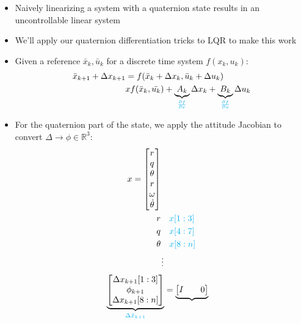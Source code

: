 \documentclass[11pt]{article}
\begin{document}
\begin{itemize}
    \item Naively linearizing a system with a quaternion state results in an uncontrollable linear system
    \item We'll apply our quaternion differentiation tricks to LQR to make this work
    \item Given a reference $\bar{x}_k, \bar{u}_k$ for a discrete time system $f(x_k,u_k):$
    \begin{align*}
        \bar{x}_{k+1} + \Delta x_{k+1} &= f(\bar{x}_k + \Delta x_k, \bar{u}_k + \Delta u_k)
        \\
        & xf(\bar{x}_k,\bar{u_k}) + \underbrace{A_k}_{\textcolor{cyan}{\frac{\partial f}{\partial x}}} \Delta x_k + \underbrace{B_k}_{\textcolor{cyan}{\frac{\partial f}{\partial u}}}\Delta u_k
    \end{align*}
    \item For the quaternion part of the state, we apply the attitude Jacobian to convert $\Delta \rightarrow \phi \in \mathbb{R}^3$:
\begin{align*}
    x &= \begin{bmatrix} r \\ q \\ \theta \\ r \\ \omega \\ \dot{\theta}\end{bmatrix}
    \\
    & \hspace{10mm}r  \quad\textcolor{cyan}{x[1:3]} \\
    & \hspace{10mm}q  \quad\textcolor{cyan}{x[4:7]}\\
    & \hspace{10mm}\theta  \quad\textcolor{cyan}{x[8:n]} \\
    & \hspace{12mm} \vdots
\end{align*}
\begin{align*}
    \underbrace{\begin{bmatrix}
        \Delta x_{k+1}[1:3]
        \\
        \phi_{k+1}
        \\
        \Delta x_{k+1}[8:n]
    \end{bmatrix}}_{\textcolor{cyan}{\Delta\tilde{x}_{k+1}}}
    &=
    \underbrace{\begin{bmatrix}
        I & & 0 \\

\end{bmatrix}}
\end{align*}
\end{itemize}
\end{document}
